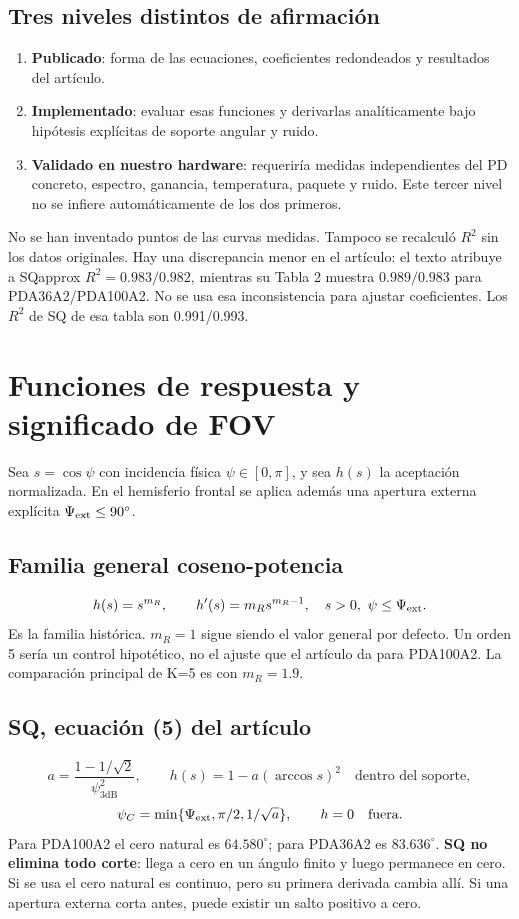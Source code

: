 \documentclass[11pt,a4paper]{article}
\begin{document}
\subsection{Tres niveles distintos de afirmación}
\begin{enumerate}
\item \textbf{Publicado}: forma de las ecuaciones, coeficientes redondeados y resultados del artículo.
\item \textbf{Implementado}: evaluar esas funciones y derivarlas analíticamente bajo hipótesis explícitas de soporte angular y ruido.
\item \textbf{Validado en nuestro hardware}: requeriría medidas independientes del PD concreto, espectro, ganancia, temperatura, paquete y ruido. Este tercer nivel no se infiere automáticamente de los dos primeros.
\end{enumerate}
No se han inventado puntos de las curvas medidas. Tampoco se recalculó $R^2$ sin los datos originales. Hay una discrepancia menor en el artículo: el texto atribuye a SQapprox $R^2=0.983/0.982$, mientras su Tabla 2 muestra $0.989/0.983$ para PDA36A2/PDA100A2. No se usa esa inconsistencia para ajustar coeficientes. Los $R^2$ de SQ de esa tabla son 0.991/0.993.

\section{Funciones de respuesta y significado de FOV}
Sea $s=\cos\psi$ con incidencia física $\psi\in[0,\pi]$, y sea $h(s)$ la aceptación normalizada. En el hemisferio frontal se aplica además una apertura externa explícita $\Psi_{\rm ext}\leq90^\circ$.

\subsection{Familia general coseno-potencia}
\begin{equation}
 h(s)=s^{m_R},\qquad h'(s)=m_Rs^{m_R-1},\quad
 s>0,\ \psi\leq\Psi_{\rm ext}.
\end{equation}
Es la familia histórica. $m_R=1$ sigue siendo el valor general por defecto. Un orden 5 sería un control hipotético, no el ajuste que el artículo da para PDA100A2. La comparación principal de K=5 es con $m_R=1.9$.

\subsection{SQ, ecuación (5) del artículo}
\begin{equation}
 a=\frac{1-1/\sqrt2}{\psi_{3\mathrm{dB}}^2},\qquad
 h(s)=1-a(\arccos s)^2\quad\text{dentro del soporte},
\end{equation}
\begin{equation}
 \psi_C=\min\{\Psi_{\rm ext},\pi/2,1/\sqrt a\},\qquad h=0\quad\text{fuera}.
\end{equation}
Para PDA100A2 el cero natural es $64.580^\circ$; para PDA36A2 es $83.636^\circ$. \textbf{SQ no elimina todo corte}: llega a cero en un ángulo finito y luego permanece en cero. Si se usa el cero natural es continuo, pero su primera derivada cambia allí. Si una apertura externa corta antes, puede existir un salto positivo a cero.
\end{document}
